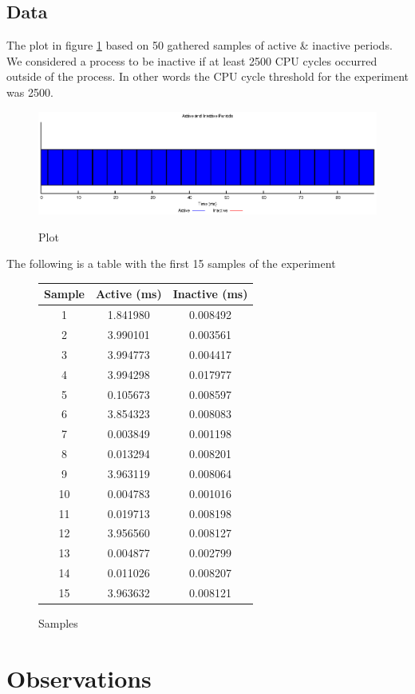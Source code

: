 \documentclass[oneside]{amsart}
\theoremstyle{definition}
\theoremstyle{remark}
\numberwithin{equation}{section}
\begin{document}
\subsection{Data}
The plot in figure \ref{fig:plot} based on 50 gathered samples of active \& inactive periods. We
considered a process to be inactive if at least 2500 CPU cycles occurred outside of the process. In
other words the CPU cycle threshold for the experiment was 2500.

\begin{figure}[h]
    \caption{Plot}
    \centering
    \includegraphics[scale=1]{A1P1.eps}
    \label{fig:plot}
\end{figure}

\newpage

The following is a table with the first 15 samples of the experiment

\begin{figure}[h]
    \caption{Samples}
    \begin{tabular}{c|c|c}
        Sample & Active (ms) & Inactive (ms) \\
        \hline
        1 & 1.841980 & 0.008492 \\
        2 & 3.990101 & 0.003561 \\
        3 & 3.994773 & 0.004417 \\
        4 & 3.994298 & 0.017977 \\
        5 & 0.105673 & 0.008597 \\
        6 & 3.854323 & 0.008083 \\
        7 & 0.003849 & 0.001198 \\
        8 & 0.013294 & 0.008201 \\
        9 & 3.963119 & 0.008064 \\
        10 & 0.004783 & 0.001016 \\
        11 & 0.019713 & 0.008198 \\
        12 & 3.956560 & 0.008127 \\
        13 & 0.004877 & 0.002799 \\
        14 & 0.011026 & 0.008207 \\
        15 & 3.963632 & 0.008121
    \end{tabular}
\end{figure}

\section{Observations}

\end{document}
